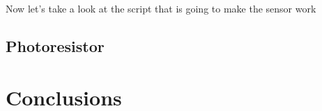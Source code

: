 Now let's take a look at the script that is going to make the sensor work



\subsection{Photoresistor}

\section{Conclusions}



